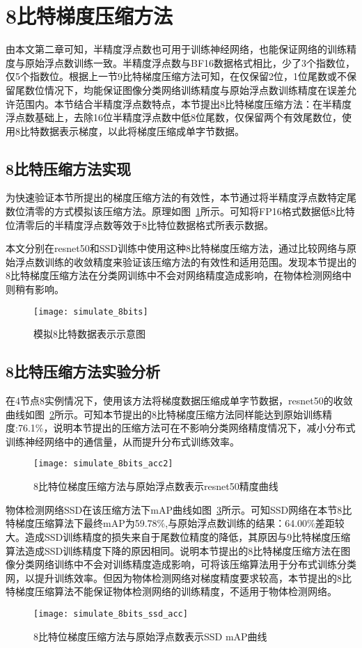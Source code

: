 \section{8比特梯度压缩方法}
由本文第二章可知，半精度浮点数也可用于训练神经网络，也能保证网络的训练精度与原始浮点数训练一致。半精度浮点数与BF16数据格式相比，少了3个指数位，仅5个指数位。根据上一节9比特梯度压缩方法可知，在仅保留2位，1位尾数或不保留尾数位情况下，均能保证图像分类网络训练精度与原始浮点数训练精度在误差允许范围内。本节结合半精度浮点数特点，本节提出8比特梯度压缩方法：在半精度浮点数基础上，去除16位半精度浮点数中低8位尾数，仅保留两个有效尾数位，使用8比特数据表示梯度，以此将梯度压缩成单字节数据。
\subsection{8比特压缩方法实现}
为快速验证本节所提出的梯度压缩方法的有效性，本节通过将半精度浮点数特定尾数位清零的方式模拟该压缩方法。原理如图~\ref{fig:simulate_8bits}所示。可知将FP16格式数据低8比特位清零后的半精度浮点数等效于8比特位数据格式所表示数据。

本文分别在resnet50和SSD训练中使用这种8比特梯度压缩方法，通过比较网络与原始浮点数训练的收敛精度来验证该压缩方法的有效性和适用范围。发现本节提出的8比特梯度压缩方法在分类网训练中不会对网络精度造成影响，在物体检测网络中则稍有影响。
\begin{figure}[htp]
\centering
\texttt{[image: simulate\_8bits]}
\caption{模拟8比特数据表示示意图}
\label{fig:simulate_8bits}
\end{figure}

\subsection{8比特压缩方法实验分析}
在4节点8实例情况下，使用该方法将梯度数据压缩成单字节数据，resnet50的收敛曲线如图~\ref{fig:simulate_8bits_acc}所示。可知本节提出的8比特梯度压缩方法同样能达到原始训练精度:76.1\%，说明本节提出的压缩方法可在不影响分类网络精度情况下，减小分布式训练神经网络中的通信量，从而提升分布式训练效率。
\begin{figure}[htp]
\centering
\texttt{[image: simulate\_8bits\_acc2]}
\caption{8比特位梯度压缩方法与原始浮点数表示resnet50精度曲线}
\label{fig:simulate_8bits_acc}
\end{figure}

物体检测网络SSD在该压缩方法下mAP曲线如图~\ref{fig:simulate_8bits_ssd_acc}所示。可知SSD网络在本节8比特梯度压缩算法下最终mAP为59.78\%,与原始浮点数训练的结果：64.00\%差距较大。造成SSD训练精度的损失来自于尾数位精度的降低，其原因与9比特梯度压缩算法造成SSD训练精度下降的原因相同。说明本节提出的8比特梯度压缩方法在图像分类网络训练中不会对训练精度造成影响，可将该压缩算法用于分布式训练分类网，以提升训练效率。但因为物体检测网络对梯度精度要求较高，本节提出的8比特梯度压缩算法不能保证物体检测网络的训练精度，不适用于物体检测网络。
\begin{figure}[htp]
\centering
\texttt{[image: simulate\_8bits\_ssd\_acc]}
\caption{8比特位梯度压缩方法与原始浮点数表示SSD mAP曲线}
\label{fig:simulate_8bits_ssd_acc}
\end{figure}

